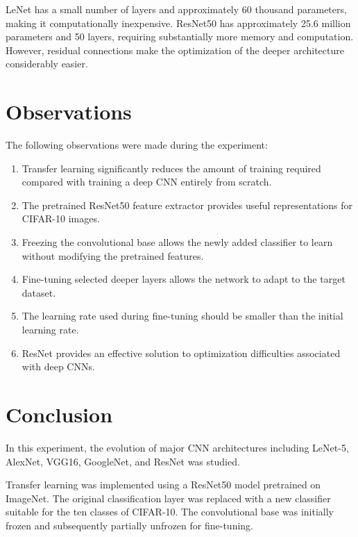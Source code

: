 \documentclass[12pt,a4paper]{article}
\begin{document}
LeNet has a small number of layers and approximately 60 thousand parameters, making it computationally inexpensive. ResNet50 has approximately 25.6 million parameters and 50 layers, requiring substantially more memory and computation. However, residual connections make the optimization of the deeper architecture considerably easier.


\section{Observations}

The following observations were made during the experiment:

\begin{enumerate}
    \item Transfer learning significantly reduces the amount of training required compared with training a deep CNN entirely from scratch.
    \item The pretrained ResNet50 feature extractor provides useful representations for CIFAR-10 images.
    \item Freezing the convolutional base allows the newly added classifier to learn without modifying the pretrained features.
    \item Fine-tuning selected deeper layers allows the network to adapt to the target dataset.
    \item The learning rate used during fine-tuning should be smaller than the initial learning rate.
    \item ResNet provides an effective solution to optimization difficulties associated with deep CNNs.
\end{enumerate}


\section{Conclusion}

In this experiment, the evolution of major CNN architectures including LeNet-5, AlexNet, VGG16, GoogleNet, and ResNet was studied.

Transfer learning was implemented using a ResNet50 model pretrained on ImageNet. The original classification layer was replaced with a new classifier suitable for the ten classes of CIFAR-10. The convolutional base was initially frozen and subsequently partially unfrozen for fine-tuning.
\end{document}
